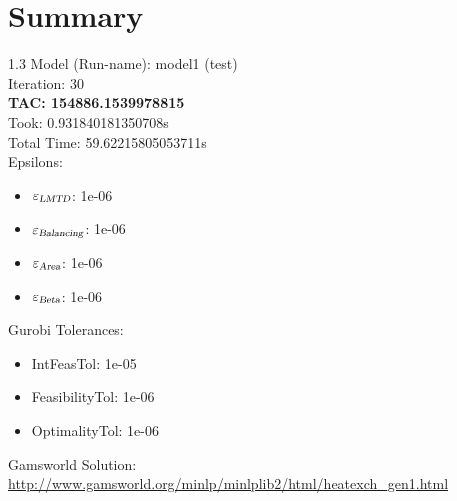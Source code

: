 \documentclass{article}%
\begin{document}
%
\normalsize%
\section{Summary}%
\thispagestyle{plain}%
\begin{spacing}{1.3}%
\Large%
Model (Run-name): model1 (test)\\%
Iteration: 30\\%
\textbf{TAC: 154886.1539978815}\\%
Took: 0.931840181350708s\\%
Total Time: 59.62215805053711s\\%
Epsilons:%
\begin{itemize}%
	\item $\varepsilon_{\textsl{LMTD}}$: 1e-06%
	\item $\varepsilon_{\textsl{Balancing}}$: 1e-06%
	\item $\varepsilon_{\textsl{Area}}$: 1e-06%
	\item $\varepsilon_{\textsl{Beta}}$: 1e-06%
\end{itemize}%
Gurobi Tolerances:%
\begin{itemize}%
	\item IntFeasTol: 1e-05%
	\item FeasibilityTol: 1e-06%
	\item OptimalityTol: 1e-06%
\end{itemize}%
\end{spacing}%
\normalsize%
Gamsworld Solution: \url{http://www.gamsworld.org/minlp/minlplib2/html/heatexch_gen1.html}%
%
\clearpage%
\end{document}
